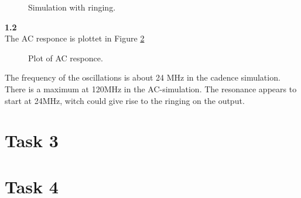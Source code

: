 \documentclass[a4paper,english,11pt]{article}
\begin{document}
\begin{figure}[!htbp]
 \centering
  \caption{Simulation with ringing.}
  \label{fig:sim:ring}	
\end{figure}
\newpage
\textbf{1.2}\\
The AC responce is plottet in Figure \ref{fig:ac:responce}\\
\begin{figure}[!htbp]
 \centering
  \caption{Plot of AC responce.}
  \label{fig:ac:responce}	
\end{figure}

The frequency of the oscillations is about 24 MHz in the cadence simulation. There is a maximum at 120MHz in the AC-simulation. The   resonance appears to start at 24MHz, witch could give rise to the ringing on the output. 

\section{Task 3}

\section{Task 4}

\end{document}
